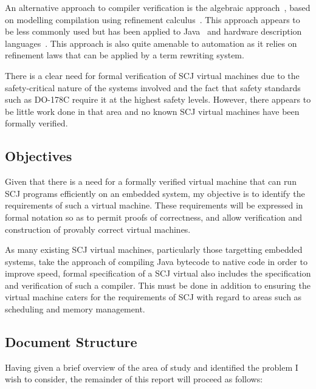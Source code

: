 \documentclass[a4paper,10pt]{article}
\begin{document}
An alternative approach to compiler verification is the algebraic
approach~\cite{hoare1991, sampaio1993}, based on modelling compilation using
refinement calculus~\cite{back1981, morgan1990, morris1987}. This approach
appears to be less commonly used but has been applied to Java~\cite{duran2005,
  duran2010} and hardware description languages~\cite{perna2010,
  perna2011}. This approach is also quite amenable to automation as it relies on
refinement laws that can be applied by a term rewriting system.

There is a clear need for formal verification of SCJ virtual machines due to the
safety-critical nature of the systems involved and the fact that safety
standards such as DO-178C require it at the highest safety levels. However,
there appears to be little work done in that area and no known SCJ virtual
machines have been formally verified.


\subsection{Objectives}

Given that there is a need for a formally verified virtual machine that can run
SCJ programs efficiently on an embedded system, my objective is to identify the
requirements of such a virtual machine. These requirements will be expressed in
formal notation so as to permit proofs of correctness, and allow verification
and construction of provably correct virtual machines.

As many existing SCJ virtual machines, particularly those targetting embedded
systems, take the approach of compiling Java bytecode to native code in order to
improve speed, formal specification of a SCJ virtual also includes the
specification and verification of such a compiler. This must be done in addition
to ensuring the virtual machine caters for the requirements of SCJ with regard
to areas such as scheduling and memory management.

\subsection{Document Structure}

Having given a brief overview of the area of study and identified the problem I
wish to consider, the remainder of this report will proceed as follows: 
\end{document}
